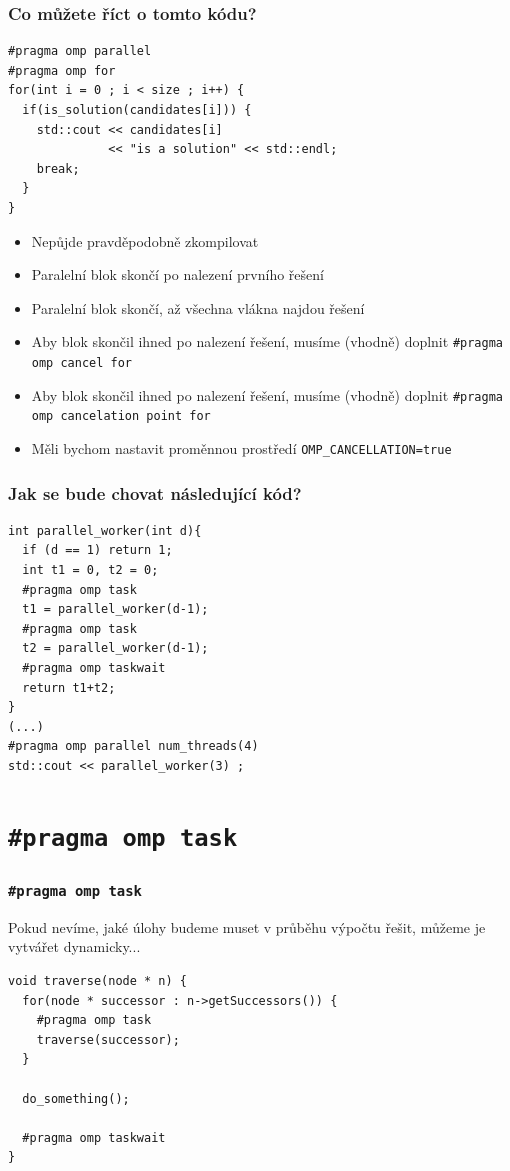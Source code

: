 \documentclass[usenames,dvipsnames,9pt]{beamer}
\begin{document}
{
\begin{frame}[fragile]
\frametitle{Co můžete říct o tomto kódu?}

  \begin{verbatim}
#pragma omp parallel
#pragma omp for
for(int i = 0 ; i < size ; i++) {
  if(is_solution(candidates[i])) {
    std::cout << candidates[i]
              << "is a solution" << std::endl;
    break;
  }
}
  \end{verbatim}
  
  \vspace{.3em}
  
  \begin{itemize}
  \item Nepůjde pravděpodobně zkompilovat
  \item Paralelní blok skončí po nalezení prvního řešení
  \item Paralelní blok skončí, až všechna vlákna najdou řešení
  \item Aby blok skončil ihned po nalezení řešení, musíme (vhodně) doplnit \texttt{\#pragma omp cancel for}
  \item Aby blok skončil ihned po nalezení řešení, musíme (vhodně) doplnit \texttt{\#pragma omp cancelation point for}
  \item Měli bychom nastavit proměnnou prostředí \texttt{OMP\_CANCELLATION=true}
  \end{itemize}

\end{frame}

\begin{frame}[fragile]
\frametitle{Jak se bude chovat následující kód?}

  \begin{verbatim}
int parallel_worker(int d){
  if (d == 1) return 1;
  int t1 = 0, t2 = 0;
  #pragma omp task
  t1 = parallel_worker(d-1);
  #pragma omp task
  t2 = parallel_worker(d-1);
  #pragma omp taskwait
  return t1+t2;
}
(...)
#pragma omp parallel num_threads(4)
std::cout << parallel_worker(3) ;
  \end{verbatim}

\end{frame}
}


\section{\texttt{\#pragma omp task}}

\begin{frame}[fragile]
	\frametitle{\texttt{\#pragma omp task}}
	Pokud nevíme, jaké úlohy budeme muset v průběhu výpočtu řešit, můžeme je vytvářet dynamicky...

	\begin{verbatim}
void traverse(node * n) {
  for(node * successor : n->getSuccessors()) {
    #pragma omp task
    traverse(successor);
  }

  do_something();
  
  #pragma omp taskwait
}
 	\end{verbatim}
\end{frame}
\end{document}
